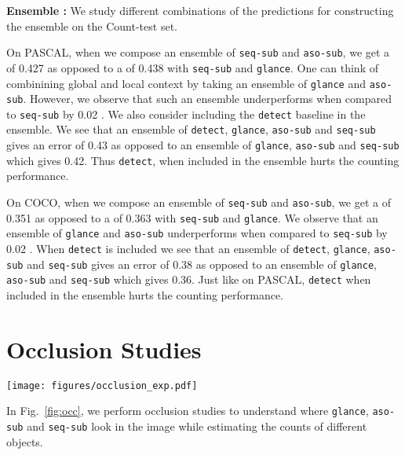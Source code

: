 \documentclass[10pt,twocolumn,letterpaper]{article}
\newcommand{\detect}{\texttt{detect}\xspace}
\newcommand{\sub}{\texttt{aso-sub}\xspace}
\newcommand{\seq}{\texttt{seq-sub}\xspace}
\newcommand{\glance}{\texttt{glance}\xspace}
\newcommand{\reffig}[1]{Fig.~\ref{#1}}
\begin{document}
\textbf{Ensemble : }
We study different combinations of the predictions for constructing the ensemble on the Count-test set.

On PASCAL, when we compose an ensemble of \seq and \sub, we get a  of 0.427 as opposed to a  of 0.438 with \seq and \glance. One can think of combinining global and local context by taking an ensemble of \glance and \sub. However, we observe that such an ensemble underperforms when compared to \seq by 0.02 . We also consider including the \detect baseline in the ensemble. We see that an ensemble of \detect, \glance, \sub and \seq gives an error of 0.43  as opposed to an ensemble of \glance, \sub and \seq which gives  0.42. Thus \detect, when included in the ensemble hurts the counting performance.

On COCO, when we compose an ensemble of \seq and \sub, we get a  of 0.351 as opposed to a  of 0.363 with \seq and \glance. We observe that an ensemble of \glance and \sub underperforms when compared to \seq by 0.02 . When \detect is included we see that an ensemble of \detect, \glance, \sub and \seq gives an error of 0.38  as opposed to an ensemble of \glance, \sub and \seq which gives  0.36. Just like on PASCAL, \detect when included in the ensemble hurts the counting performance. 
\section{Occlusion Studies}\label{sec:occ}
\begin{figure*}
\texttt{[image: figures/occlusion\_exp.pdf]}
\caption{Occlusion maps obtained on COCO Count-test images for \glance, \seq and \sub by moving a mask of size  over the images before doing a forward pass through each of the models. Notice how \glance{} and \seq{} approaches tend to look at similar regions for lower counts, while for higher counts \seq{} and \sub{} tend to be more similar.}
\label{fig:occ}
\vspace{-10pt}
\end{figure*}

In \reffig{fig:occ}, we perform occlusion studies to understand where \glance, \sub and \seq look in the image while estimating the counts of different objects. 
\end{document}
